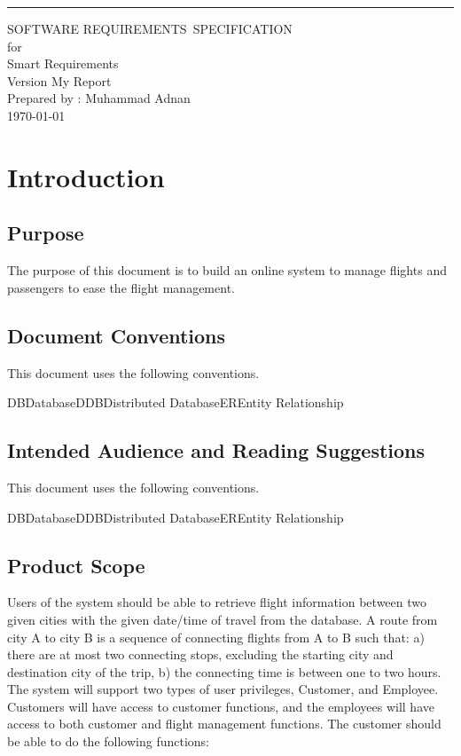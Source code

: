 \documentclass{scrreprt}
\date{}
\def\myversion{My Report}
\begin{document}
    
    \begin{flushright}
        \rule{16cm}{5pt}\vskip1cm
        \begin{bfseries}
            \Huge{SOFTWARE REQUIREMENTS\ SPECIFICATION}\
            \vspace{1.5cm} 
            \\for\\
            \vspace{1.5cm}
            Smart Requirements\\
            \vspace{1.5cm}
            \LARGE{Version \myversion}\\
            \vspace{1.5cm}
            Prepared by : Muhammad Adnan\\ 
            \vspace{1.5cm}
            \today\
        \end{bfseries}
    \end{flushright}
    
    
    \tableofcontents
    
    \chapter{Introduction} 
    \section{Purpose}
    The purpose of this document is to build an online system to manage flights and passengers to ease the flight management.
    \section{Document Conventions} 
    This document uses the following conventions.

DBDatabaseDDBDistributed DatabaseEREntity Relationship
    \section{Intended Audience and Reading Suggestions}
    This document uses the following conventions.

DBDatabaseDDBDistributed DatabaseEREntity Relationship
    \section{Product Scope}
    Users of the system should be able to retrieve flight information between two given cities with the given date/time of travel from the database. A route from city A to city B is a sequence of connecting flights from A to B such that: a) there are at most two connecting stops, excluding the starting city and destination city of the trip, b) the connecting time is between one to two hours. The system will support two types of user privileges, Customer, and Employee. Customers will have access to customer functions, and the employees will have access to both customer and flight management functions. The customer should be able to do the following functions:
\end{document}

